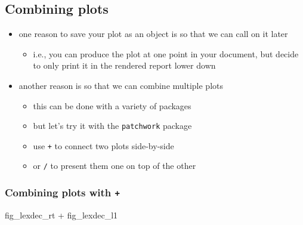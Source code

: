 \documentclass[
  letterpaper,
  DIV=11]{scrartcl}
\newenvironment{Shaded}{\begin{snugshade}}{\end{snugshade}}
\newcommand{\NormalTok}[1]{\textcolor[rgb]{0.00,0.23,0.31}{#1}}
\newcommand{\SpecialCharTok}[1]{\textcolor[rgb]{0.37,0.37,0.37}{#1}}
\providecommand{\tightlist}{%
  \setlength{\itemsep}{0pt}\setlength{\parskip}{0pt}}\usepackage{longtable,booktabs,array}
\theoremstyle{definition}
\theoremstyle{remark}
\begin{document}
\hypertarget{combining-plots}{%
\subsection{Combining plots}\label{combining-plots}}

\begin{itemize}
\tightlist
\item
  one reason to save your plot as an object is so that we can call on it
  later

  \begin{itemize}
  \tightlist
  \item
    i.e., you can produce the plot at one point in your document, but
    decide to only print it in the rendered report lower down
  \end{itemize}
\item
  another reason is so that we can combine multiple plots

  \begin{itemize}
  \tightlist
  \item
    this can be done with a variety of packages
  \item
    but let's try it with the \texttt{patchwork} package
  \item
    use \texttt{+} to connect two plots side-by-side
  \item
    or \texttt{/} to present them one on top of the other
  \end{itemize}
\end{itemize}

\hypertarget{combining-plots-with}{%
\subsubsection{\texorpdfstring{Combining plots with
\texttt{+}}{Combining plots with +}}\label{combining-plots-with}}

\begin{Shaded}
\begin{Highlighting}[]
\NormalTok{fig\_lexdec\_rt }\SpecialCharTok{+}\NormalTok{ fig\_lexdec\_l1}
\end{Highlighting}
\end{Shaded}
\end{document}
